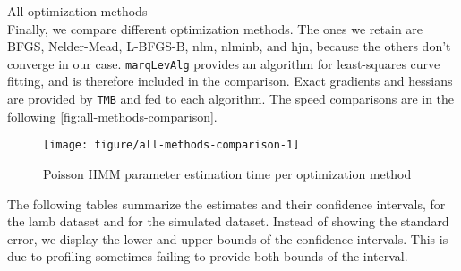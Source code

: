 \documentclass[bimj,fleqn]{w-art}\usepackage[]{graphicx}\usepackage[]{color}
\makeatletter
\def\maxwidth{ %
  \ifdim\Gin@nat@width>\linewidth
    \linewidth
  \else
    \Gin@nat@width
  \fi
}
\newenvironment{knitrout}{}{} %
\theoremstyle{plain}
\theoremstyle{definition}
\makeatother
\begin{document}
\label{txt:all-methods-comparison} All optimization methods\\
Finally, we compare different optimization methods.
The ones we retain are BFGS, Nelder-Mead, L-BFGS-B, nlm, nlminb, and hjn, because the others don't converge in our case.
{\tt{marqLevAlg}} provides an algorithm for least-squares curve fitting, and is therefore included in the comparison.
Exact gradients and hessians are provided by {\tt{TMB}} and fed to each algorithm.
The speed comparisons are in the following \autoref{fig:all-methods-comparison}.

\begin{knitrout}
\color{fgcolor}\begin{figure}[htb]

{\centering \texttt{[image: figure/all-methods-comparison-1]} 

}

\caption[Poisson HMM parameter estimation time per optimization method]{Poisson HMM parameter estimation time per optimization method}\label{fig:all-methods-comparison}
\end{figure}


\end{knitrout}

The following tables summarize the estimates and their confidence intervals, for the lamb dataset and for the simulated dataset.
Instead of showing the standard error, we display the lower and upper bounds of the confidence intervals.
This is due to profiling sometimes failing to provide both bounds of the interval.
\end{document}
